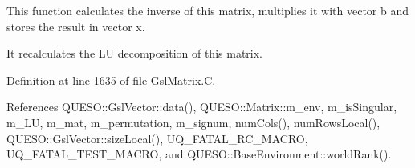 This function calculates the inverse of {\ttfamily this} matrix, multiplies it with vector {\ttfamily b} and stores the result in vector {\ttfamily x}. 

It recalculates the L\-U decomposition of {\ttfamily this} matrix. 

Definition at line 1635 of file Gsl\-Matrix.\-C.



References Q\-U\-E\-S\-O\-::\-Gsl\-Vector\-::data(), Q\-U\-E\-S\-O\-::\-Matrix\-::m\-\_\-env, m\-\_\-is\-Singular, m\-\_\-\-L\-U, m\-\_\-mat, m\-\_\-permutation, m\-\_\-signum, num\-Cols(), num\-Rows\-Local(), Q\-U\-E\-S\-O\-::\-Gsl\-Vector\-::size\-Local(), U\-Q\-\_\-\-F\-A\-T\-A\-L\-\_\-\-R\-C\-\_\-\-M\-A\-C\-R\-O, U\-Q\-\_\-\-F\-A\-T\-A\-L\-\_\-\-T\-E\-S\-T\-\_\-\-M\-A\-C\-R\-O, and Q\-U\-E\-S\-O\-::\-Base\-Environment\-::world\-Rank().


